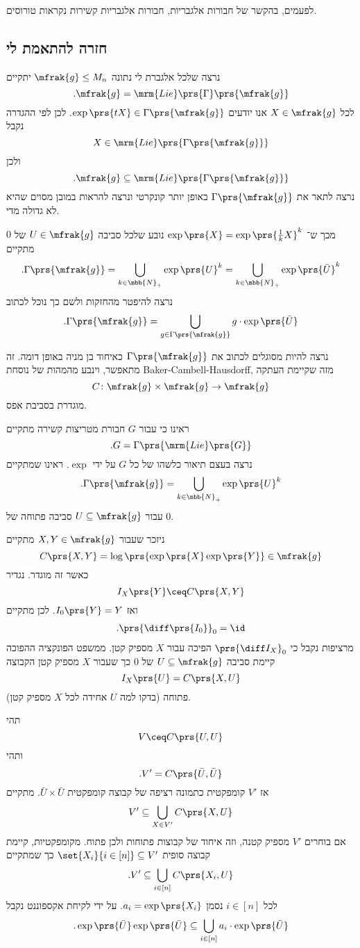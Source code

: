 \documentclass[10pt, twoside]{book}
\newcommand{\textenglish}[1]{\foreignlanguage{english}{#1}}
\begin{document}
\begin{remark}
לפעמים, בהקשר של חבורות אלגבריות, חבורות אלגבריות קשירות נקראות טורוסים.
\end{remark}

\subsection{חזרה להתאמת לי}

נרצה שלכל אלגברת לי נתונה
$\mfrak{g} \leq M_n$
יתקיים
\[\text{.} \mfrak{g} = \mrm{Lie}\prs{\Gamma}\prs{\mfrak{g}}\]
לכל
$X \in \mfrak{g}$
אנו יודעים
$\exp\prs{tX} \in \Gamma\prs{\mfrak{g}}$.
לכן לפי ההגדרה נקבל
\[X \in \mrm{Lie}\prs{\Gamma\prs{\mfrak{g}}}\]
ולכן
\[\text{.} \mfrak{g} \subseteq \mrm{Lie}\prs{\Gamma\prs{\mfrak{g}}}\]
נרצה לתאר את
$\Gamma\prs{\mfrak{g}}$
באופן יותר קונקרטי ונרצה להראות במובן מסוים שהיא לא גדולה מדי.

מכך ש־%
$\exp\prs{X} = \exp\prs{\frac{1}{k} X}^k$
נובע שלכל סביבה
$U \in \mfrak{g}$
של
$0$
מתקיים
\[\text{.} \Gamma\prs{\mfrak{g}} = \bigcup_{k \in \mbb{N}_+} \exp\prs{U}^k = \bigcup_{k \in \mbb{N}_+} \exp\prs{\bar{U}}^k\]
נרצה להיפטר מהחזקות ולשם כך נוכל לכתוב
\[\text{.} \Gamma\prs{\mfrak{g}} = \bigcup_{g \in \Gamma\prs{\mfrak{g}}} g \cdot \exp\prs{\bar{U}}\]

נרצה להיות מסוגלים לכתוב את
$\Gamma\prs{\mfrak{g}}$
כאיחוד בן מניה באופן דומה.
זה מתאפשר, וינבע מהמהות של נוסחת
\textenglish{Baker-Cambell-Hausdorff},
מזה שקיימת העתקה
\[C \colon \mfrak{g} \times \mfrak{g} \to \mfrak{g}\]
מוגדרת בסביבת אפס.


ראינו כי עבור
$G$
חבורת מטריצות קשירה מתקיים
\[\text{.} G = \Gamma\prs{\mrm{Lie}\prs{G}}\]
נרצה בעצם תיאור כלשהו של כל
$G$
על ידי
$\exp$.
ראינו שמתקיים
\[\text{.} \Gamma\prs{\mfrak{g}} = \bigcup_{k \in \mbb{N}_+} \exp\prs{U}^k\]
עבור
$U \subseteq \mfrak{g}$
סביבה פתוחה של
$0$.

ניזכר שעבור
$X,Y \in \mfrak{g}$
מתקיים
\[C\prs{X,Y} = \log\prs{\exp\prs{X} \exp\prs{Y}} \in \mfrak{g}\]
כאשר זה מוגדר.
נגדיר
\[I_X\prs{Y} \ceq C\prs{X,Y}\]
ואז
$I_0\prs{Y} = Y$.
לכן מתקיים
\begin{align*}
\text{.} \prs{\diff\prs{I_0}}_0 = \id
\end{align*}
מרציפות נקבל כי
$\prs{\diff I_X}_0$
הפיכה עבור
$X$
מספיק קטן.
ממשפט הפונקציה ההפוכה קיימת סביבה
$U \subseteq \mfrak{g}$
של
$0$
כך שעבור
$X$
מספיק קטן הקבוצה
\[I_X\prs{U} = C\prs{X,U}\]
פתוחה (בדקו למה
$U$
אחידה לכל
$X$
מספיק קטן).

תהי
\[V \ceq C\prs{U,U}\]
ותהי
\[\text{.} V' = C\prs{\bar{U}, \bar{U}}\]
אז
$V'$
קומפקטית כתמונה רציפה של קבוצה קומפקטית
$\bar{U} \times \bar{U}$.
מתקיים
\[V' \subseteq \bigcup_{X \in V'} C\prs{X,U}\]
אם בוחרים
$V'$
מספיק קטנה, וזה איחוד של קבוצות פתוחות ולכן פתוח.
מקומפקטיות, קיימת קבוצה סופית
$\set{X_i}{i \in [n]} \subseteq V'$
כך שמתקיים
\[\text{.} V' \subseteq \bigcup_{i \in [n]} C\prs{X_i, U}\]
לכל
$i \in [n]$
נסמן
$a_i = \exp\prs{X_i}$.
על ידי לקיחת אקספוננט נקבל
\[\text{.} \exp\prs{\bar{U}} \exp\prs{\bar{U}} \subseteq \bigcup_{i \in [n]} a_i \cdot \exp\prs{\bar{U}}\]
\end{document}

